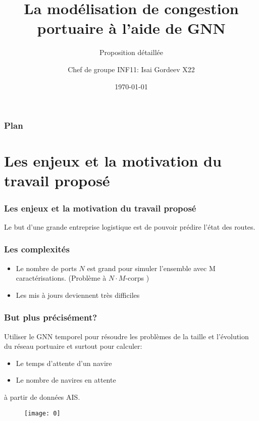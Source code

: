 \documentclass{beamer}
\title[Proposition détaillée]{La modélisation de congestion portuaire à l'aide de GNN}
\subtitle{Proposition détaillée}
\author[INF11]{Chef de groupe INF11: Isai Gordeev X22\\}
\institute[]{École Polytechnique\\ Palaiseau}
\date{\today}
\begin{document}
	
	\begin{frame}
		\titlepage
	\end{frame}
	
	\begin{frame}
		\frametitle{Plan}
			\tableofcontents
	\end{frame}


	\section{Les enjeux et la motivation du travail proposé}
	
	
\begin{frame}
	\frametitle{Les enjeux et la motivation du travail proposé}
	\begin{center}
	Le but d'une grande entreprise logistique est de pouvoir prédire l'état des routes. 
	\end{center}
	
\end{frame}

\begin{frame}
	\frametitle{Les complexités}
	\begin{center}
		\begin{itemize}
			\item Le nombre de ports $N$ est grand pour simuler l'ensemble avec M caractérisations. (Problème à $N\cdot M$-corps )
			\item Les mis à jours deviennent très difficiles
		\end{itemize}
	\end{center}
	
\end{frame}


\begin{frame}
	\frametitle{But plus précisément?}
	Utiliser le GNN temporel pour résoudre les problèmes de la taille et l'évolution du réseau portuaire et surtout pour calculer:
	\begin{itemize}
		\item Le temps d'attente d'un navire
		\item Le nombre de navires en attente
	\end{itemize}
	à partir de données AIS. 
	
	\begin{figure}
	\texttt{[image: 0]}
	\label{fig:example}
	\end{figure}
	
\end{frame}
\end{document}
